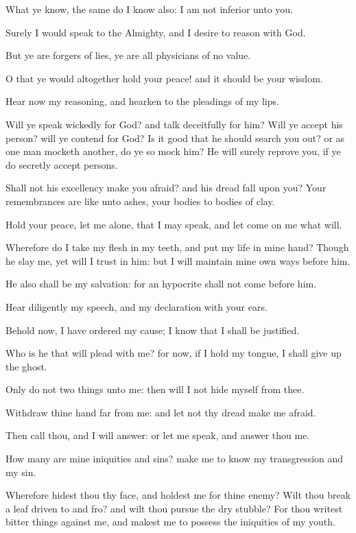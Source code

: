 \verse What ye know, the same do I know also: I am not inferior unto you.

\verse Surely I would speak to the Almighty, and I desire to reason with God.

\verse But ye are forgers of lies, ye are all physicians of no value.

\verse O that ye would altogether hold your peace! and it should be your wisdom.

\verse Hear now my reasoning, and hearken to the pleadings of my lips.

\verse Will ye speak wickedly for God? and talk deceitfully for him?  \verse Will ye accept his person? will ye contend for God?  \verse Is it good that he should search you out? or as one man mocketh another, do ye so mock him?  \verse He will surely reprove you, if ye do secretly accept persons.

\verse Shall not his excellency make you afraid? and his dread fall upon you?  \verse Your remembrances are like unto ashes, your bodies to bodies of clay.

\verse Hold your peace, let me alone, that I may speak, and let come on me what will.

\verse Wherefore do I take my flesh in my teeth, and put my life in mine hand?  \verse Though he slay me, yet will I trust in him: but I will maintain mine own ways before him.

\verse He also shall be my salvation: for an hypocrite shall not come before him.

\verse Hear diligently my speech, and my declaration with your ears.

\verse Behold now, I have ordered my cause; I know that I shall be justified.

\verse Who is he that will plead with me? for now, if I hold my tongue, I shall give up the ghost.

\verse Only do not two things unto me: then will I not hide myself from thee.

\verse Withdraw thine hand far from me: and let not thy dread make me afraid.

\verse Then call thou, and I will answer: or let me speak, and answer thou me.

\verse How many are mine iniquities and sins? make me to know my transgression and my sin.

\verse Wherefore hidest thou thy face, and holdest me for thine enemy?  \verse Wilt thou break a leaf driven to and fro? and wilt thou pursue the dry stubble?  \verse For thou writest bitter things against me, and makest me to possess the iniquities of my youth.

